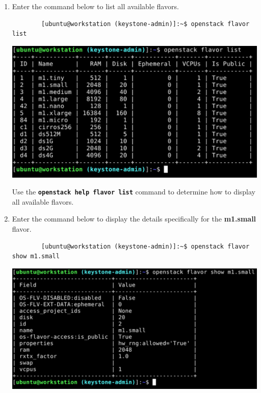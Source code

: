 \documentclass[letterpaper, 12pt]{article}
\begin{document}
\begin{enumerate}
    \item Enter the command below to list all available flavors.
    \begin{lstlisting}
        [ubuntu@workstation (keystone-admin)]:~$ openstack flavor list
    \end{lstlisting}

    \begin{center}
        \includegraphics[width=\linewidth]{images/part2/step9.png}
    \end{center}

    \begin{tipbox}
        Use the \textbf{\texttt{openstack help flavor list}} command to determine how to display all available flavors.
    \end{tipbox}

    \item Enter the command below to display the details specifically for the \textbf{m1.small} flavor.
    \begin{lstlisting}
        [ubuntu@workstation (keystone-admin)]:~$ openstack flavor show m1.small
    \end{lstlisting}

    \begin{center}
        \includegraphics[width=\linewidth]{images/part2/step10.png}
    \end{center}


\end{enumerate}
\end{document}
